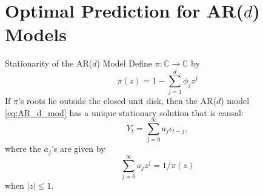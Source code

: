 \documentclass{beamer}
\def\C{\mathbb C}
\def\Z{{\mathbb Z}}
\begin{document}
\section{Optimal Prediction for AR($d$) Models}


\begin{frame}{Stationarity of the AR($d$) Model}
    Define $\pi : \C \to \C$ by
    \[
    \pi(z) = 1 - \sum_{j = 1}^d \phi_j z^j
    \]
    If $\pi$'s roots lie outside the closed unit disk, then the AR($d$) model \eqref{eq:AR_d_mod} has a unique stationary solution that is causal:
    \begin{equation}\label{eq:AR_d_mod_solution}
        Y_t = \sum_{j = 0}^\infty a_j \epsilon_{t - j},
    \end{equation}
    where the $a_j$'s are given by
    \[
    \sum_{j = 0}^\infty a_j z^j = 1 / \pi(z)
    \]
    when $|z| \le 1$.
\end{frame}
\end{document}
